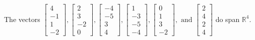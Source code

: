 \begin{exercise}
\begin{exerciseStatement}
  \end{exerciseStatement}
  \begin{exerciseAnswer}
   The vectors \(\left[\begin{array}{r}
4 \\
-1 \\
1 \\
-2
\end{array}\right] , \left[\begin{array}{r}
2 \\
3 \\
-2 \\
0
\end{array}\right] , \left[\begin{array}{r}
-4 \\
-5 \\
3 \\
4
\end{array}\right] , \left[\begin{array}{r}
1 \\
-3 \\
-5 \\
-4
\end{array}\right] , \left[\begin{array}{r}
0 \\
1 \\
3 \\
-2
\end{array}\right] , \text{ and } \left[\begin{array}{r}
2 \\
4 \\
2 \\
4
\end{array}\right]\) 
  	 do  
	span \(\mathbb{R}^4\).
  


  \end{exerciseAnswer}
\end{exercise}